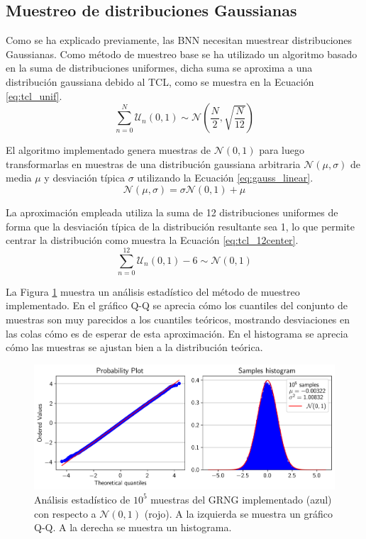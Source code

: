 \subsection{Muestreo de distribuciones Gaussianas}

Como se ha explicado previamente, las BNN necesitan muestrear distribuciones Gaussianas. Como método de muestreo base se ha utilizado un algoritmo basado en la suma de distribuciones uniformes, dicha suma se aproxima a una distribución gaussiana debido al TCL, como se muestra en la Ecuación \ref{eq:tcl_unif}.
\begin{equation} \label{eq:tcl_unif}
\sum_{n=0}^{N} \mathcal{U}_n(0,1) \sim \mathcal{N} \left( \dfrac{N}{2}, \sqrt{\dfrac{N}{12}} \right)
\end{equation}

El algoritmo implementado genera muestras de $\mathcal{N}(0,1)$ para luego transformarlas en muestras de una distribución gaussiana arbitraria $\mathcal{N}(\mu, \sigma)$ de media $\mu$ y desviación típica $\sigma$ utilizando la Ecuación \ref{eq:gauss_linear}.
\begin{equation} \label{eq:gauss_linear}
\mathcal{N}(\mu, \sigma) = \sigma \mathcal{N}(0,1) + \mu
\end{equation}

La aproximación empleada utiliza la suma de 12 distribuciones uniformes de forma que la desviación típica de la distribución resultante sea 1, lo que permite centrar la distribución como muestra la Ecuación \ref{eq:tcl_12center}.
\begin{equation} \label{eq:tcl_12center}
\sum_{n=0}^{12} \mathcal{U}_n(0,1) - 6 \sim \mathcal{N}(0,1)
\end{equation}

La Figura \ref{fig:gauss_aprox} muestra un análisis estadístico del método de muestreo implementado. En el gráfico Q-Q se aprecia cómo los cuantiles del conjunto de muestras son muy parecidos a los cuantiles teóricos, mostrando desviaciones en las colas cómo es de esperar de esta aproximación. En el histograma se aprecia cómo las muestras se ajustan bien a la distribución teórica.

\begin{figure}[h]
	\centering
	\includegraphics[width=\textwidth]{root/Imagenes/bnn_lib/gaus_aprox.png}
	\caption{Análisis estadístico de $10^5$ muestras del GRNG implementado (azul) con respecto a $\mathcal{N}(0,1)$ (rojo). A la izquierda se muestra un gráfico Q-Q. A la derecha se muestra un histograma.}
	\label{fig:gauss_aprox}
\end{figure}

